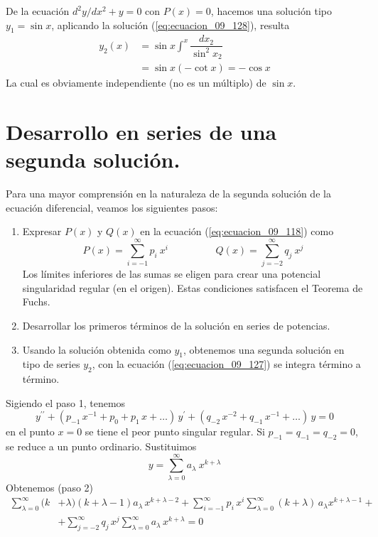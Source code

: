 De la ecuación $d^{2} y / dx^{2} + y = 0$ con $P(x)=0$, hacemos una solución tipo $y_{1} = \sin x$, aplicando la solución (\ref{eq:ecuacion_09_128}), resulta
\begin{align*}
y_{2}(x) &= \sin x \int^{x} \dfrac{dx_{2}}{\sin^{2} x_{2}} \\
&= \sin x (-\cot x) = - \cos x
\end{align*}
La cual es obviamente independiente (no es un múltiplo) de $\sin x$.
\section{Desarrollo en series de una segunda solución.}
Para una mayor comprensión en la naturaleza de la segunda solución de la ecuación diferencial, veamos los siguientes pasos:
\begin{enumerate}
\item Expresar $P(x)$ y $Q(x)$ en la ecuación (\ref{eq:ecuacion_09_118}) como
\begin{equation}
P(x) = \sum_{i=-1}^{\infty} p_{i} \: x^{i} \hspace{2cm} Q(x) = \sum_{j=-2}^{\infty} q_{j} \: x^{j}
\label{eq:ecuacion_09_129}
\end{equation}
Los límites inferiores de las sumas se eligen para crear una potencial singularidad regular (en el origen). Estas condiciones satisfacen el Teorema de Fuchs.
\item Desarrollar los primeros términos de la solución en series de potencias.
\item Usando la solución obtenida como $y_{1}$, obtenemos una segunda solución en tipo de series $y_{2}$, con la ecuación (\ref{eq:ecuacion_09_127}) se integra término a término.
\end{enumerate}
Sigiendo el paso 1, tenemos
\begin{equation}
y^{\prime \prime} + (p_{-1} \, x^{-1} + p_{0} + p_{1} \, x + \ldots) \, y^{\prime} + (q_{-2} \, x^{-2} + q_{-1} \, x^{-1} + \ldots) \, y = 0
\label{eq:ecuacion_09_130}
\end{equation}
en el punto $x = 0$ se tiene el peor punto singular regular. Si $p_{-1} = q_{-1} = q_{-2} = 0$, se reduce a un punto ordinario. Sustituimos
\[ y = \sum_{\lambda = 0}^{\infty} a_{\lambda} \: x^{k + \lambda} \]
Obtenemos (paso 2)
\begin{equation}
\begin{aligned}
\sum_{\lambda=0}^{\infty} (k &+ \lambda)(k + \lambda - 1) a_{\lambda} \, x^{k + \lambda - 2} + \sum_{i=-1}^{\infty} p_{i} \, x^{i} \sum_{\lambda=0}^{\infty} (k + \lambda) \,  a_{\lambda} x^{k + \lambda - 1} + \\
&+ \sum_{j=-2}^{\infty} q_{j} \, x^{j} \sum_{\lambda=0}^{\infty} a_{\lambda} \, x^{k + \lambda} = 0
\end{aligned}
\label{eq:ecuacion_09_131}
\end{equation}
